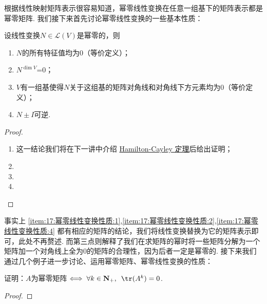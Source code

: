 根据线性映射矩阵表示很容易知道，幂零线性变换在任意一组基下的矩阵表示都是幂零矩阵. 我们接下来首先讨论幂零线性变换的一些基本性质：
\begin{theorem} \label{thm:17:幂零线性变换性质}
    设线性变换$N\in \mathcal{L}(V)$是幂零的，则
    \begin{enumerate}
        \item \label{item:17:幂零线性变换性质:1}
              $N$的所有特征值均为0（等价定义）；

        \item \label{item:17:幂零线性变换性质:2}
              $N^{\dim V}$=0；

        \item \label{item:17:幂零线性变换性质:3}
              $V$有一组基使得$N$关于这组基的矩阵对角线和对角线下方元素均为0（等价定义）；

        \item \label{item:17:幂零线性变换性质:4}
              $N\pm I$可逆.
    \end{enumerate}
\end{theorem}

\begin{proof}
    \begin{enumerate}
        \item 这一结论我们将在下一讲中介绍 \hyperref[thm:21:HC]{Hamilton-Cayley 定理}后给出证明；

        \item

        \item

        \item
    \end{enumerate}
\end{proof}

事实上 \ref*{item:17:幂零线性变换性质:1},\ref*{item:17:幂零线性变换性质:2},\ref*{item:17:幂零线性变换性质:4} 都有相应的矩阵的结论，我们将线性变换替换为它的矩阵表示即可，此处不再赘述. 而第三点则解释了我们在求矩阵的幂时将一些矩阵分解为一个矩阵加一个对角线上全为0的矩阵的合理性，因为后者一定是幂零的. 接下来我们通过几个例子进一步讨论、运用幂零矩阵、幂零线性变换的性质：
\begin{example}
    证明：$A$为幂零矩阵$\iff \forall k \in \mathbf{N}_+,\enspace\tr(A^k)=0$.
\end{example}

\begin{proof}

\end{proof}

